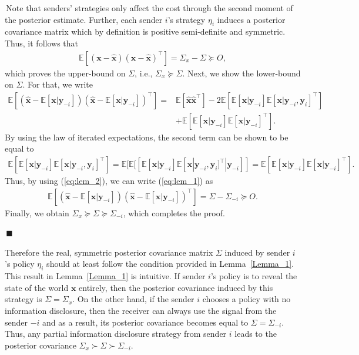 \documentclass[12pt,journal,onecolumn]{IEEEtran}
\newenvironment{Proof}[1]{\medskip\par\noindent{\bf Proof:\,}\,#1}{{\mbox{\,$\blacksquare$}\par}}
\begin{document}
\begin{Proof}
Note that senders' strategies only affect the cost through the second moment of the posterior estimate. Further, each sender $i$'s strategy $\eta_i$ induces a posterior covariance matrix which by definition is positive semi-definite and symmetric. Thus, it follows that 
 \begin{align*}
     \mathbb{E}[(\boldsymbol{x}-\hat{\boldsymbol{x}})(\boldsymbol{x}-\hat{\boldsymbol{x}})^\top]=\Sigma_x-\Sigma\succeq O,
 \end{align*}
 which proves the upper-bound on $\Sigma$, i.e., $\Sigma_x\succeq\Sigma$. Next, we show the lower-bound on $\Sigma$. For that, we write 
 \begin{align}\label{eq:lem_1}
     \mathbb{E}[(\hat{\boldsymbol{x}}-\mathbb{E}[\boldsymbol{x}|\boldsymbol{y}_{-i}])(\hat{\boldsymbol{x}}-\mathbb{E}[\boldsymbol{x}|\boldsymbol{y}_{-i}])^\top]=&\mathbb{E}[\hat{\boldsymbol{x}}\hat{\boldsymbol{x}}^\top]-2\mathbb{E}[\mathbb{E}[\boldsymbol{x}|\boldsymbol{y}_{-i}]\mathbb{E}[\boldsymbol{x}|\boldsymbol{y}_{-i},\boldsymbol{y}_i]^\top]\nonumber\\&+\mathbb{E}[\mathbb{E}[\boldsymbol{x}|\boldsymbol{y}_{-i}]\mathbb{E}[\boldsymbol{x}|\boldsymbol{y}_{-i}]^\top].
 \end{align}
 By using the law of iterated expectations, the second term can be shown to be equal to
 \begin{align}\label{eq:lem_2}
     \mathbb{E}[\mathbb{E}[\boldsymbol{x}|\boldsymbol{y}_{-i}]\mathbb{E}[\boldsymbol{x}|\boldsymbol{y}_{-i},\boldsymbol{y}_i]^\top]=\mathbb{E}[\mathbb{E}[[\mathbb{E}[\boldsymbol{x}|\boldsymbol{y}_{-i}]\mathbb{E}[\boldsymbol{x}|\boldsymbol{y}_{-i},\boldsymbol{y}_i]^\top|\boldsymbol{y}_{-i}]]=\mathbb{E}[\mathbb{E}[\boldsymbol{x}|\boldsymbol{y}_{-i}]\mathbb{E}[\boldsymbol{x}|\boldsymbol{y}_{-i}]^\top].
 \end{align}
 Thus, by using (\ref{eq:lem_2}), we can write (\ref{eq:lem_1}) as
 \begin{align*}
     \mathbb{E}[(\hat{\boldsymbol{x}}-\mathbb{E}[\boldsymbol{x}|\boldsymbol{y}_{-i}])(\hat{\boldsymbol{x}}-\mathbb{E}[\boldsymbol{x}|\boldsymbol{y}_{-i}])^\top]=\Sigma-\Sigma_{-i}\succeq O.
 \end{align*}
 Finally, we obtain $\Sigma_x\succeq \Sigma\succeq \Sigma_{-i}$, which completes the proof.
\end{Proof}
Therefore the real, symmetric posterior covariance matrix $\Sigma$ induced by sender $i$'s policy $\eta_i$ should at least follow the condition provided in Lemma~\ref{Lemma_1}. This result in Lemma~\ref{Lemma_1} is intuitive. If sender $i$'s policy is to reveal the state of the world $\boldsymbol{x}$ entirely, then the posterior covariance induced by this strategy is $\Sigma = \Sigma_x$. On the other hand, if the sender $i$ chooses a policy with no information disclosure, then the receiver can always use the signal from the sender $-i$ and as a result, its posterior covariance becomes equal to $\Sigma = \Sigma_{-i}$. Thus, any partial information disclosure strategy from sender $i$ leads to the posterior covariance $\Sigma_x\succ \Sigma\succ \Sigma_{-i}$. %
\end{document}

